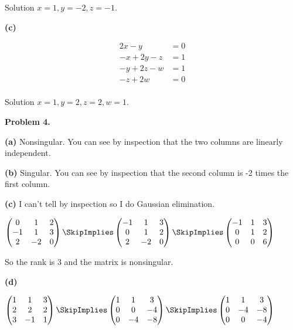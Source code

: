 \documentclass[oneside,12pt]{amsart}
\begin{document}
Solution $x=1, y=-2, z=-1$.

\bigskip


\textbf{(c)}

\begin{align*}
  2x - y          &= 0 \\
 -x + 2y -  z     &= 1 \\
      -y  +2z -w  &= 1 \\
           -z+2w  &= 0 \\
\end{align*}

Solution $x=1, y=2, z=2, w=1$.

\bigskip

\textbf{Problem 4.}

\textbf{(a)} Nonsingular. You can see by inspection that the two columns are linearly independent.

\bigskip

\textbf{(b)} Singular. You can see by inspection that the second column is -2 times the first column.

\bigskip

\textbf{(c)} I can't tell by inspection so I do Gaussian elimination.

\bigskip

$
\begin{pmatrix}
0 & 1 & 2 \\
-1 & 1 & 3 \\
2 & -2 & 0
\end{pmatrix}
\SkipImplies
\begin{pmatrix}
-1 & 1 & 3 \\
0 & 1 & 2 \\
2 & -2 & 0
\end{pmatrix}
\SkipImplies
\begin{pmatrix}
-1 & 1 & 3 \\
0 & 1 & 2 \\
0 & 0 & 6
\end{pmatrix}
$

\bigskip

So the rank is 3 and the matrix is nonsingular.

\bigskip

\textbf{(d)}

$
\begin{pmatrix}
1 & 1 & 3 \\
2 & 2 & 2 \\
3 & -1 & 1
\end{pmatrix}
\SkipImplies
\begin{pmatrix}
1 & 1 & 3 \\
0 & 0 & -4 \\
0 & -4 & -8
\end{pmatrix}
\SkipImplies
\begin{pmatrix}
1 & 1 & 3 \\
0 & -4 & -8 \\
0 & 0 & -4
\end{pmatrix}
$
\end{document}
